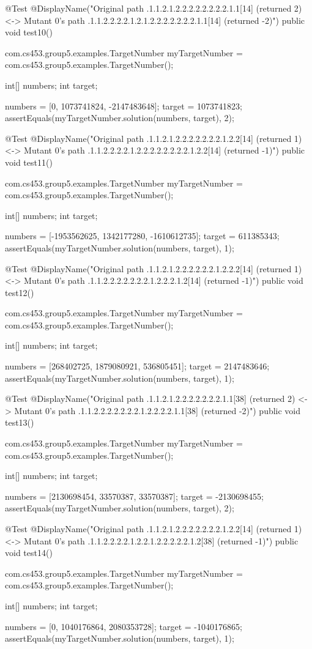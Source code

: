 @Test
@DisplayName("Original path .1.1.2.1.2.2.2.2.2.2.2.2.1.1[14] (returned 2) <-> Mutant 0's path .1.1.2.2.2.2.1.2.1.2.2.2.2.2.2.2.1.1[14] (returned -2)")
public void test10() {
    com.cs453.group5.examples.TargetNumber myTargetNumber = com.cs453.group5.examples.TargetNumber();

    int[] numbers;
    int target;

    numbers = [0, 1073741824, -2147483648];
    target = 1073741823;
    assertEquals(myTargetNumber.solution(numbers, target), 2);
}

@Test
@DisplayName("Original path .1.1.2.1.2.2.2.2.2.2.2.1.2.2[14] (returned 1) <-> Mutant 0's path .1.1.2.2.2.2.1.2.2.2.2.2.2.2.2.1.2.2[14] (returned -1)")
public void test11() {
    com.cs453.group5.examples.TargetNumber myTargetNumber = com.cs453.group5.examples.TargetNumber();

    int[] numbers;
    int target;

    numbers = [-1953562625, 1342177280, -1610612735];
    target = 611385343;
    assertEquals(myTargetNumber.solution(numbers, target), 1);
}

@Test
@DisplayName("Original path .1.1.2.1.2.2.2.2.2.2.1.2.2.2[14] (returned 1) <-> Mutant 0's path .1.1.2.2.2.2.2.2.2.1.2.2.2.1.2[14] (returned -1)")
public void test12() {
    com.cs453.group5.examples.TargetNumber myTargetNumber = com.cs453.group5.examples.TargetNumber();

    int[] numbers;
    int target;

    numbers = [268402725, 1879080921, 536805451];
    target = 2147483646;
    assertEquals(myTargetNumber.solution(numbers, target), 1);
}

@Test
@DisplayName("Original path .1.1.2.1.2.2.2.2.2.2.2.1.1[38] (returned 2) <-> Mutant 0's path .1.1.2.2.2.2.2.2.2.1.2.2.2.2.1.1[38] (returned -2)")
public void test13() {
    com.cs453.group5.examples.TargetNumber myTargetNumber = com.cs453.group5.examples.TargetNumber();

    int[] numbers;
    int target;

    numbers = [2130698454, 33570387, 33570387];
    target = -2130698455;
    assertEquals(myTargetNumber.solution(numbers, target), 2);
}

@Test
@DisplayName("Original path .1.1.2.1.2.2.2.2.2.2.2.1.2.2[14] (returned 1) <-> Mutant 0's path .1.1.2.2.2.2.1.2.2.1.2.2.2.2.2.1.2[38] (returned -1)")
public void test14() {
    com.cs453.group5.examples.TargetNumber myTargetNumber = com.cs453.group5.examples.TargetNumber();

    int[] numbers;
    int target;

    numbers = [0, 1040176864, 2080353728];
    target = -1040176865;
    assertEquals(myTargetNumber.solution(numbers, target), 1);
}

